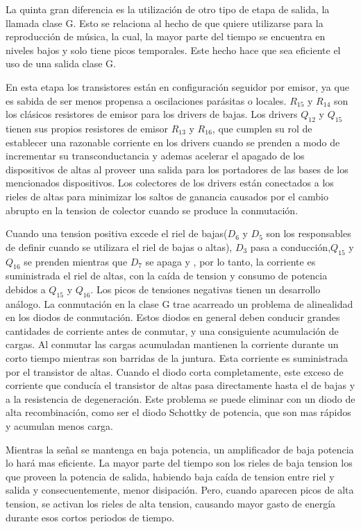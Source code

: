 La quinta gran diferencia es la utilización de otro tipo de etapa de salida, la llamada clase G. Esto se relaciona al hecho de que quiere utilizarse para la reproducción de música, la cual, la mayor parte del tiempo se encuentra en niveles bajos y solo tiene picos temporales. Este hecho hace que sea eficiente el uso de una salida clase G.

En esta etapa los transistores están en configuración seguidor por emisor, ya que es sabida de ser menos propensa a oscilaciones parásitas o locales. $R_{15}$ y $R_{14}$  son los clásicos resistores de emisor para los drivers de bajas. Los drivers $Q_{12}$ y $Q_{15}$ tienen sus propios resistores de emisor $R_{13}$ y $R_{16}$, que cumplen su rol de establecer una razonable corriente en los drivers cuando se prenden a modo de incrementar su transconductancia y ademas acelerar el apagado de los dispositivos de altas al proveer una salida para los portadores de las bases de los mencionados dispositivos. Los colectores de los drivers están conectados a los rieles de altas para minimizar los saltos de ganancia causados por el cambio abrupto en la tension de colector cuando se produce la conmutación.

Cuando una tension positiva excede el riel de bajas($D_6$ y $D_5$ son los responsables de definir cuando se utilizara el riel de bajas o altas), $D_3$ pasa a conducción,$Q_{15}$ y $Q_{16}$ se prenden mientras que $D_7$ se apaga y , por lo tanto, la corriente es suministrada  el riel de altas, con la caída de tension y consumo de potencia debidos a $Q_{15}$ y $Q_{16}$. Los picos de tensiones negativas tienen un desarrollo análogo.
La conmutación en la clase G trae acarreado un problema de alinealidad en los diodos de conmutación. Estos diodos en general deben conducir grandes cantidades de corriente antes de conmutar, y una consiguiente acumulación de cargas. Al conmutar las cargas acumuladan mantienen la corriente durante un corto tiempo mientras son barridas de la juntura. Esta corriente es suministrada por el transistor de altas. Cuando el diodo corta completamente, este exceso de corriente que conducía el transistor de altas pasa directamente hasta el de bajas y a la resistencia de degeneración. Este problema se puede eliminar con un diodo de alta recombinación, como ser el diodo Schottky de potencia, que son mas rápidos y acumulan menos carga.

Mientras la señal se mantenga en baja potencia, un amplificador de baja potencia lo hará mas eficiente. La mayor parte del tiempo son los rieles de baja tension los que proveen la potencia de salida, habiendo baja caída de tension entre riel y salida y consecuentemente, menor disipación. Pero, cuando aparecen picos de alta tension, se activan los rieles de alta tension, causando mayor gasto de energía durante esos cortos periodos de tiempo.

